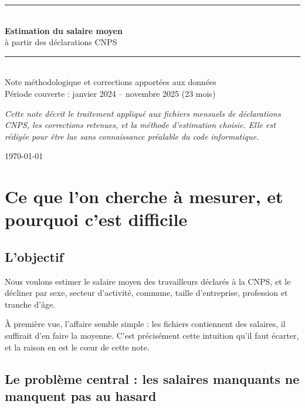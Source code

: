 \documentclass[11pt,a4paper]{article}
\begin{document}
\begin{titlepage}
\centering
\vspace*{2.5cm}
{\color{bleufonce}\rule{\textwidth}{1.5pt}}\\[0.6cm]
{\Huge\bfseries\color{bleufonce} Estimation du salaire moyen}\\[0.35cm]
{\Large\color{bleufonce} à partir des déclarations CNPS}\\[0.6cm]
{\color{bleufonce}\rule{\textwidth}{1.5pt}}\\[1.4cm]

{\large Note méthodologique et corrections apportées aux données}\\[0.5cm]
{\large Période couverte : janvier 2024 -- novembre 2025 (23 mois)}\\[3cm]

\begin{minipage}{0.8\textwidth}
\centering\itshape
Cette note décrit le traitement appliqué aux fichiers mensuels de
déclarations CNPS, les corrections retenues, et la méthode d'estimation
choisie. Elle est rédigée pour être lue sans connaissance préalable du
code informatique.
\end{minipage}

\vfill
{\large\today}
\end{titlepage}

\tableofcontents
\newpage

\section{Ce que l'on cherche à mesurer, et pourquoi c'est difficile}

\subsection{L'objectif}

Nous voulons estimer le salaire moyen des travailleurs déclarés à la
CNPS, et le décliner par sexe, secteur d'activité, commune, taille
d'entreprise, profession et tranche d'âge.

À première vue, l'affaire semble simple : les fichiers contiennent des
salaires, il suffirait d'en faire la moyenne. C'est précisément cette
intuition qu'il faut écarter, et la raison en est le c\oe ur de cette note.

\subsection{Le problème central : les salaires manquants ne manquent pas au hasard}
\end{document}
